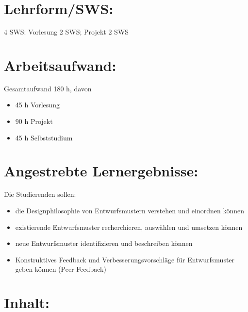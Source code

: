 \section*{Lehrform/SWS:}\label{lehrformsws-12}

4 SWS: Vorlesung 2 SWS; Projekt 2 SWS

\section*{Arbeitsaufwand:}\label{arbeitsaufwand-18}

Gesamtaufwand 180 h, davon

\begin{itemize}
\item
  45 h Vorlesung
\item
  90 h Projekt
\item
  45 h Selbststudium
\end{itemize}

\section*{Angestrebte
Lernergebnisse:}\label{angestrebte-lernergebnisse-12}

Die Studierenden sollen:

\begin{itemize}
\item
  die Designphilosophie von Entwurfsmustern verstehen und einordnen
  können
\item
  existierende Entwurfsmuster recherchieren, auswählen und umsetzen
  können
\item
  neue Entwurfsmuster identifizieren und beschreiben können
\item
  Konstruktives Feedback und Verbesserungsvorschläge für Entwurfsmuster
  geben können (Peer-Feedback)
\end{itemize}

\section*{Inhalt:}\label{inhalt-12}

